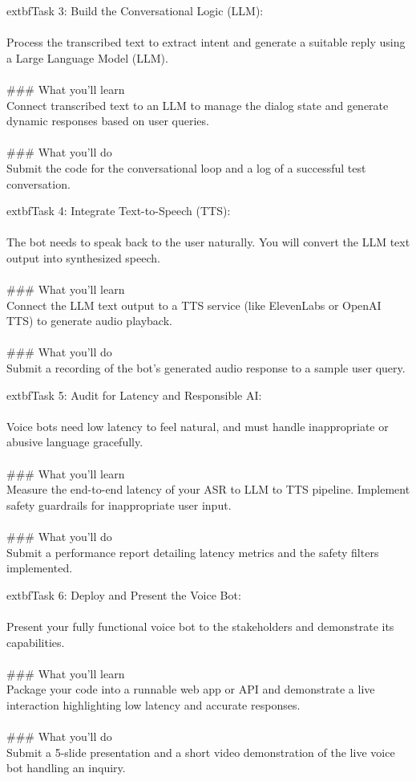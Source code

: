 \documentclass{article}
\begin{document}
	extbf{Task 3: Build the Conversational Logic (LLM):}  \\
 \\
 Process the transcribed text to extract intent and generate a suitable reply using a Large Language Model (LLM). \\
 \\
### What you'll learn \\
Connect transcribed text to an LLM to manage the dialog state and generate dynamic responses based on user queries. \\
 \\
### What you'll do \\
Submit the code for the conversational loop and a log of a successful test conversation.

	extbf{Task 4: Integrate Text-to-Speech (TTS):}  \\
 \\
 The bot needs to speak back to the user naturally. You will convert the LLM text output into synthesized speech. \\
 \\
### What you'll learn \\
Connect the LLM text output to a TTS service (like ElevenLabs or OpenAI TTS) to generate audio playback. \\
 \\
### What you'll do \\
Submit a recording of the bot's generated audio response to a sample user query.

	extbf{Task 5: Audit for Latency and Responsible AI:}  \\
 \\
 Voice bots need low latency to feel natural, and must handle inappropriate or abusive language gracefully. \\
 \\
### What you'll learn \\
Measure the end-to-end latency of your ASR to LLM to TTS pipeline. Implement safety guardrails for inappropriate user input. \\
 \\
### What you'll do \\
Submit a performance report detailing latency metrics and the safety filters implemented.

	extbf{Task 6: Deploy and Present the Voice Bot:}  \\
 \\
 Present your fully functional voice bot to the stakeholders and demonstrate its capabilities. \\
 \\
### What you'll learn \\
Package your code into a runnable web app or API and demonstrate a live interaction highlighting low latency and accurate responses. \\
 \\
### What you'll do \\
Submit a 5-slide presentation and a short video demonstration of the live voice bot handling an inquiry.
\end{document}
